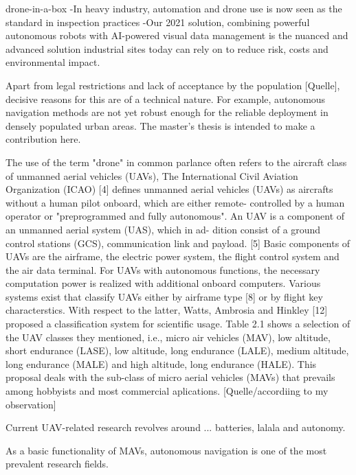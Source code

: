 drone-in-a-box %
-In heavy industry, automation and drone use is now seen as the standard in inspection practices
-Our 2021 solution, combining powerful autonomous robots with AI-powered visual data management is the nuanced and advanced solution industrial sites today can rely on to reduce risk, costs and environmental impact.

Apart from legal restrictions and lack of acceptance by the population [Quelle], 
decisive reasons for this are of a technical nature.
For example, autonomous navigation methods are not yet robust enough
for the reliable deployment in densely populated urban areas.\cite{loquercio2018learning}
The master's thesis is intended to make a contribution here.





The use of the term "drone" in common parlance often refers 
to the aircraft class of unmanned aerial vehicles (UAVs),
The International Civil Aviation Organization (ICAO) [4] defines unmanned aerial
vehicles (UAVs) as aircrafts without a human pilot onboard, which are either remote-
controlled by a human operator or "preprogrammed and fully autonomous".
An UAV is a component of an unmanned aerial system (UAS), which in ad-
dition consist of a ground control stations (GCS), communication link and payload. [5]
Basic components of UAVs are the airframe, the electric power system, the flight
control system and the air data terminal. For UAVs with autonomous functions, the
necessary computation power is realized with additional onboard computers.
Various systems exist that classify UAVs either by 
airframe type [8] or by flight key characterstics.
With respect to the latter, 
Watts, Ambrosia and Hinkley [12] proposed a classification system 
for scientific usage.
Table 2.1 shows a selection of the UAV classes
they mentioned, i.e., micro air vehicles (MAV), low altitude, short endurance (LASE),
low altitude, long endurance (LALE), medium altitude, long endurance (MALE) and
high altitude, long endurance (HALE).
This proposal deals with the sub-class of micro aerial vehicles (MAVs)
that prevails among hobbyists and most commercial aplications. [Quelle/accordiing to my observation]



Current UAV-related research revolves around
... batteries, lalala
and autonomy.


As a basic functionality of MAVs, 
autonomous navigation 
is one of the most prevalent research fields.

